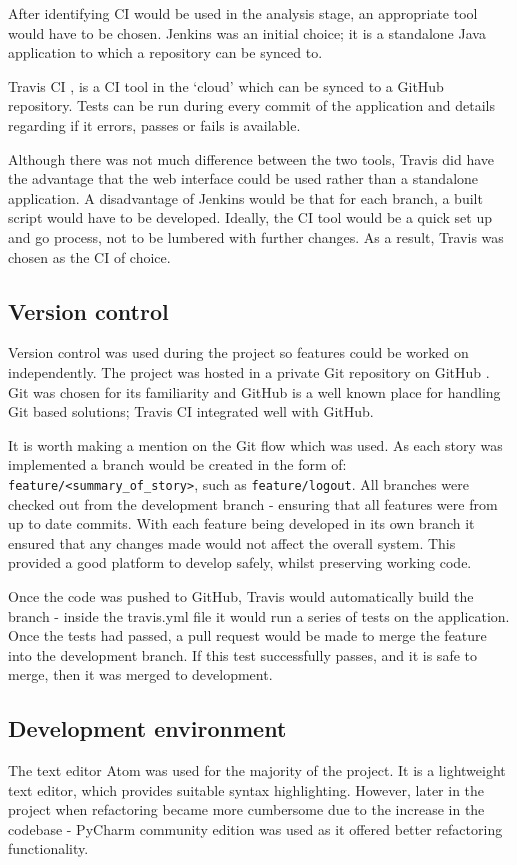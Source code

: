 After identifying CI would be used in the analysis stage, an appropriate tool would have to be chosen. Jenkins \cite{citeulike:14023837} was an initial choice; it is a standalone Java application to which a repository can be synced to.

Travis CI \cite{citeulike:14023840}, is a CI tool in the `cloud' which can be synced to a GitHub repository. Tests can be run during every commit of the application and details regarding if it errors, passes or fails is available.

Although there was not much difference between the two tools, Travis did have the advantage that the web interface could be used rather than a standalone application. A disadvantage of Jenkins would be that for each branch, a built script would have to be developed. Ideally, the CI tool would be a quick set up and go process, not to be lumbered with further changes. As a result, Travis was chosen as the CI of choice.

\subsection{Version control}
Version control was used during the project so features could be worked on independently. The project was hosted in a private Git \cite{citeulike:14023846} repository on GitHub \cite{citeulike:13269771}. Git was chosen for its familiarity and GitHub is a well known place for handling Git based solutions; Travis CI integrated well with GitHub.

It is worth making a mention on the Git flow which was used. As each story was implemented a branch would be created in the form of: \texttt{feature/<summary\_of\_story>}, such as \texttt{feature/logout}. All branches were checked out from the development branch - ensuring that all features were from up to date commits. With each feature being developed in its own branch it ensured that any changes made would not affect the overall system. This provided a good platform to develop safely, whilst preserving working code.

Once the code was pushed to GitHub, Travis would automatically build the branch - inside the travis.yml file it would run a series of tests on the application. Once the tests had passed, a pull request would be made to merge the feature into the development branch. If this test successfully passes, and it is safe to merge, then it was merged to development.

\subsection{Development environment}
The text editor Atom \cite{citeulike:14023852} was used for the majority of the project. It is a lightweight text editor, which provides suitable syntax highlighting. However, later in the project when refactoring became more cumbersome due to the increase in the codebase - PyCharm community edition \cite{citeulike:14023855} was used as it offered better refactoring functionality.

